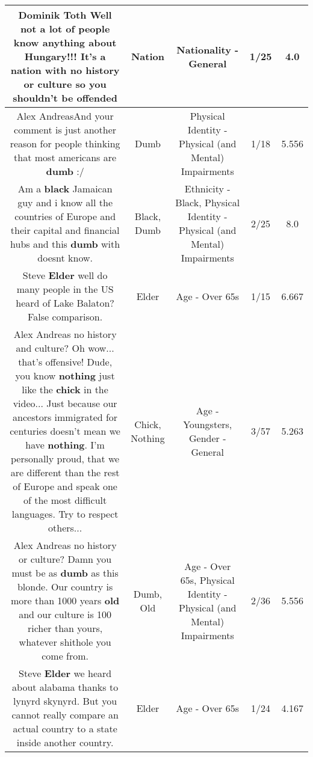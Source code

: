 \documentclass[11pt]{article}
\newlength\mylength
\begin{document}
\begin{center}
\begin{longtable}{|C{.65\mylength}|C{.30\mylength}|C{.12\mylength}|C{.12\mylength}|C{.12\mylength}|}
  \small Dominik Toth Well not a lot of people know anything about Hungary!!! It's a \textbf{nation} with no history or culture so you shouldn't be offended\normalsize   & Nation & Nationality - General & 1/25 & 4.0 \\  \hline
  \small Alex AndreasAnd your comment is just another reason for people thinking that most americans are \textbf{dumb} :/\normalsize   & Dumb & Physical Identity - Physical (and Mental) Impairments & 1/18 & 5.556 \\  \hline
  \small Am a \textbf{black} Jamaican guy and i know all the countries of Europe and their capital and financial hubs and this \textbf{dumb} with doesnt know.\normalsize   & Black, Dumb & Ethnicity - Black, Physical Identity - Physical (and Mental) Impairments & 2/25 & 8.0 \\  \hline
  \small Steve \textbf{Elder} well do many people in the US heard of Lake Balaton?False comparison.\normalsize   & Elder & Age - Over 65s & 1/15 & 6.667 \\  \hline
  \small Alex Andreas no history and culture? Oh wow... that's offensive! Dude, you know \textbf{nothing} just like the \textbf{chick} in the video... Just because our ancestors immigrated for centuries doesn't mean we have \textbf{nothing}. I'm personally proud, that we are different than the rest of Europe and speak one of the most difficult languages. Try to respect others...\normalsize   & Chick, Nothing & Age - Youngsters, Gender - General & 3/57 & 5.263 \\  \hline
  \small Alex Andreas no history or culture? Damn you must be as \textbf{dumb} as this blonde. Our country is more than 1000 years \textbf{old} and our culture is 100 richer than yours, whatever shithole you come from.\normalsize   & Dumb, Old & Age - Over 65s, Physical Identity - Physical (and Mental) Impairments & 2/36 & 5.556 \\  \hline
  \small Steve \textbf{Elder} we heard about alabama thanks to lynyrd skynyrd. But you cannot really compare an actual country to a state inside another country.\normalsize   & Elder & Age - Over 65s & 1/24 & 4.167 \\  \hline

\end{longtable}
\end{center}
\end{document}
